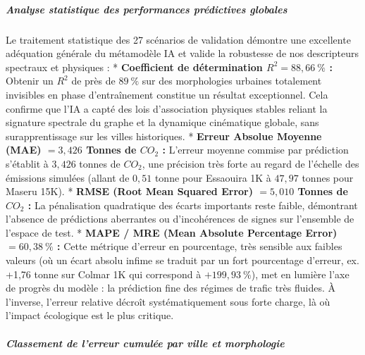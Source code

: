 \documentclass[10pt, a4paper]{article}
\begin{document}
\subparagraph{Analyse statistique des performances prédictives
globales}\label{analyse-statistique-des-performances-pruxe9dictives-globales}

Le traitement statistique des 27 scénarios de validation démontre une
excellente adéquation générale du métamodèle IA et valide la robustesse
de nos descripteurs spectraux et physiques : * \textbf{Coefficient de
détermination \(R^2 = 88,66\ \%\) :} Obtenir un \(R^2\) de près de
\(89\ \%\) sur des morphologies urbaines totalement invisibles en phase
d'entraînement constitue un résultat exceptionnel. Cela confirme que
l'IA a capté des lois d'association physiques stables reliant la
signature spectrale du graphe et la dynamique cinématique globale, sans
surapprentissage sur les villes historiques. * \textbf{Erreur Absolue
Moyenne (MAE) \(= 3,426\) Tonnes de \(CO_2\) :} L'erreur moyenne commise
par prédiction s'établit à \(3,426\) tonnes de \(CO_2\), une précision
très forte au regard de l'échelle des émissions simulées (allant de
\(0,51\) tonne pour Essaouira 1K à \(47,97\) tonnes pour Maseru 15K). *
\textbf{RMSE (Root Mean Squared Error) \(= 5,010\) Tonnes de \(CO_2\) :}
La pénalisation quadratique des écarts importants reste faible,
démontrant l'absence de prédictions aberrantes ou d'incohérences de
signes sur l'ensemble de l'espace de test. * \textbf{MAPE / MRE (Mean
Absolute Percentage Error) \(= 60,38\ \%\) :} Cette métrique d'erreur en
pourcentage, très sensible aux faibles valeurs (où un écart absolu
infime se traduit par un fort pourcentage d'erreur, ex. +1,76 tonne sur
Colmar 1K qui correspond à \(+199,93\ \%\)), met en lumière l'axe de
progrès du modèle : la prédiction fine des régimes de trafic très
fluides. À l'inverse, l'erreur relative décroît systématiquement sous
forte charge, là où l'impact écologique est le plus critique.

\subparagraph{Classement de l'erreur cumulée par ville et
morphologie}\label{classement-de-lerreur-cumuluxe9e-par-ville-et-morphologie}
\end{document}

